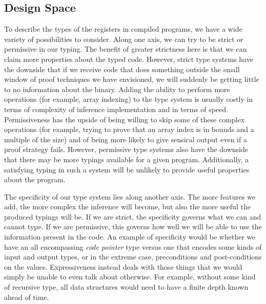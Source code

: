\subsection{Design Space}
To describe the types of the registers in compiled programs, we have a wide variety of possibilities to consider. Along one axis, we can try to be strict or permissive in our typing. The benefit of greater strictness here is that we can claim more properties about the typed code. However, strict type systems have the downside that if we receive code that does something outside the small window of proof techniques we have envisioned, we will suddenly be getting little to no information about the binary. Adding the ability to perform more operations (for example, array indexing) to the type system is usually costly in terms of complexity of inference implementation and in terms of speed. Permissiveness has the upside of being willing to skip some of these complex operations (for example, trying to prove that an array index is in bounds and a multiple of the size) and of being more likely to give sensical output even if a proof strategy fails. However, permissive type systems also have the downside that there may be more typings available for a given program. Additionally, a satisfying typing in such a system will be unlikely to provide useful properties about the program.

The specificity of our type system lies along another axis.
The more features we add, the more complex the inference will become, but also the more useful the produced typings will be. If we are strict, the specificity governs what we can and cannot type. If we are permissive, this governs how well we will be able to use the information present in the code. An example of specificity would be whether we have an all encompassing \emph{code pointer} type versus one that encodes some kinds of input and output types, or in the extreme case, preconditions and post-conditions on the values. Expressiveness instead deals with those things that we would simply be unable to even talk about otherwise. For example, without some kind of recursive type, all data structures would need to have a finite depth known ahead of time.

